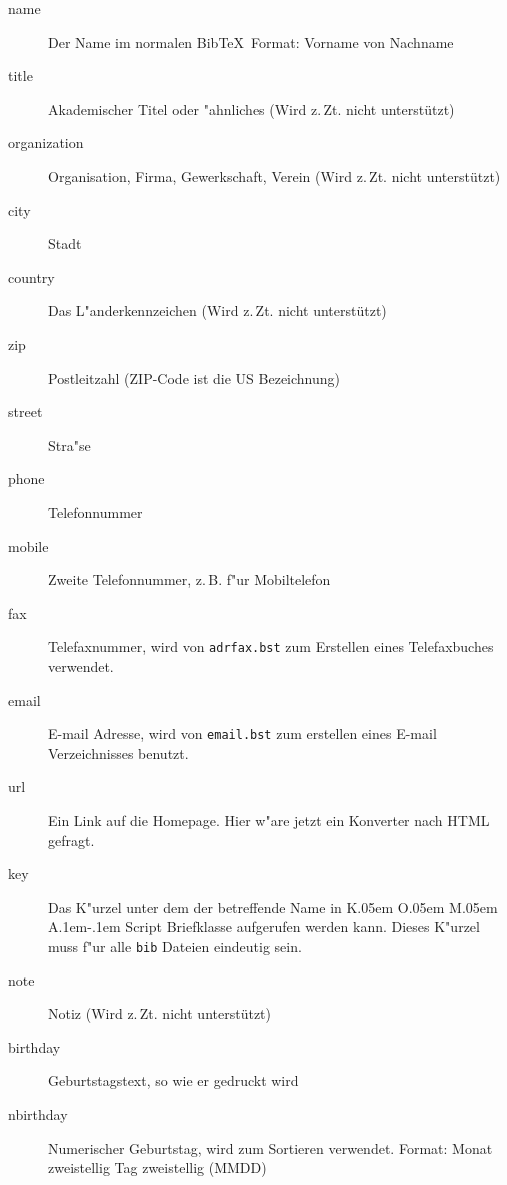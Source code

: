 \documentclass{article}
\newcommand*{\File}[1]{\texttt{#1}}
\DeclareRobustCommand{\KOMAScript}{\textsf{K\kern.05em O\kern.05em%
      M\kern.05em A\kern.1em-\kern.1em Script}}
\begin{document}
\begin{description}
	\item[name]  Der Name im normalen Bib\TeX\ Format: Vorname von 
	Nachname

	\item[title] Akademischer Titel oder "ahnliches (Wird z.\,Zt.  
	nicht unterst\"{u}tzt)
	
	\item[organization] Organisation, Firma, Gewerkschaft, Verein 
	(Wird z.\,Zt.  nicht unterst\"{u}tzt)
	
	\item[city]  Stadt
	
	\item[country] Das L"anderkennzeichen (Wird z.\,Zt.  nicht 
	unterst\"{u}tzt)

	\item[zip]  Postleitzahl (ZIP-Code ist die US Bezeichnung)

	\item[street]  Stra"se

	\item[phone]  Telefonnummer
	
	\item[mobile] Zweite Telefonnummer, z.\,B. f"ur Mobiltelefon

	\item[fax] Telefaxnummer, wird von \File{adrfax.bst} zum 
	Erstellen eines Telefaxbuches verwendet.
	
	\item[email] E-mail Adresse, wird von \File{email.bst} zum 
	erstellen eines E-mail Verzeichnisses benutzt.
	
	\item[url] Ein Link auf die Homepage. Hier w"are jetzt ein Konverter 
	nach HTML gefragt.
	
	\item[key]  Das K"urzel unter dem der betreffende Name in 
	{\KOMAScript} Briefklasse aufgerufen werden kann. Dieses K"urzel muss
	f"ur alle \texttt{bib} Dateien eindeutig sein. 

	\item[note]  Notiz (Wird z.\,Zt. nicht unterst\"{u}tzt)
	
	\item[birthday] Geburtstagstext, so wie er gedruckt wird
	
	\item[nbirthday] Numerischer Geburtstag, wird zum Sortieren 
	verwendet. Format: Monat zweistellig Tag zweistellig (MMDD)
\end{description}
\end{document}
